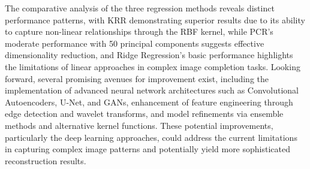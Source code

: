 \documentclass{article}
\begin{document}
    The comparative analysis of the three regression methods reveals distinct performance patterns, with KRR demonstrating superior results due to its ability to capture non-linear relationships through the RBF kernel, while PCR's moderate performance with 50 principal components suggests effective dimensionality reduction, and Ridge Regression's basic performance highlights the limitations of linear approaches in complex image completion tasks. Looking forward, several promising avenues for improvement exist, including the implementation of advanced neural network architectures such as Convolutional Autoencoders, U-Net, and GANs, enhancement of feature engineering through edge detection and wavelet transforms, and model refinements via ensemble methods and alternative kernel functions. These potential improvements, particularly the deep learning approaches, could address the current limitations in capturing complex image patterns and potentially yield more sophisticated reconstruction results.
    
\end{document}
